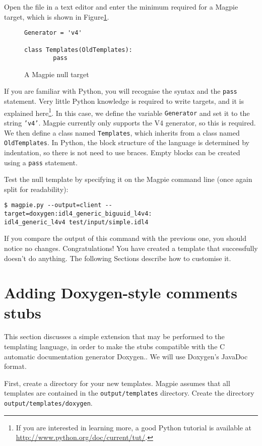 Open the file in a text editor and enter the minimum required for a Magpie target, which is shown in Figure\ref{fig:target:null}.

\begin{figure}
\begin{verbatim}
Generator = 'v4'

class Templates(OldTemplates):
        pass
\end{verbatim}
\caption{A Magpie null target}
\label{fig:target:null}
\end{figure}

If you are familiar with Python, you will recognise the syntax and the {\tt pass} statement. Very little Python knowledge is required to write targets, and it is explained here\footnote{If you are interested in learning more, a good Python tutorial is available at \url{http://www.python.org/doc/current/tut/}.}. In this case, we define the variable {\tt Generator} and set it to the string {\tt 'v4'}. Magpie currently only supports the V4 generator, so this is required. We then define a class named {\tt Templates}, which inherits from a class named {\tt OldTemplates}. In Python, the block structure of the language is determined by indentation, so there is not need to use braces. Empty blocks can be created using a {\tt pass} statement. 

Test the null template by specifying it on the Magpie command line (once again split for readability):

\begin{verbatim}
$ magpie.py --output=client --target=doxygen:idl4_generic_biguuid_l4v4:
idl4_generic_l4v4 test/input/simple.idl4
\end{verbatim}

If you compare the output of this command with the previous one, you should notice no changes. Congratulations! You have created a template that successfully doesn't do anything. The following Sections describe how to customise it.

\section{Adding Doxygen-style comments stubs}
This section discusses a simple extension that may be performed to the templating language, in order to make the stubs compatible with the C automatic documentation generator Doxygen.. We will use Doxygen's JavaDoc format.

First, create a directory for your new templates. Magpie assumes that all templates are contained in the {\tt output/templates} directory. Create the directory {\tt output/templates/doxygen}.


